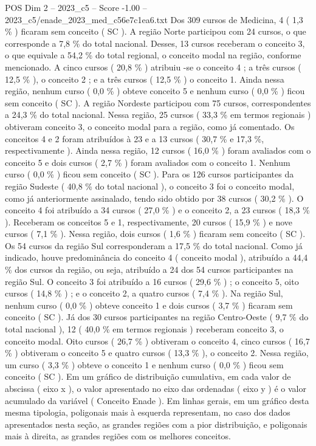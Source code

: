 \begin{textsample}{POS Dim 2 – 2023\_c5 – Score -1.00 – 2023\_c5/enade\_2023\_med\_c56e7c1ea6.txt}
Dos 309 cursos de Medicina, 4 ( 1,3 \% ) ficaram sem conceito ( SC ).
A região Norte participou com 24 cursos, o que corresponde a 7,8 \% do total nacional.
Desses, 13 cursos receberam o conceito 3, o que equivale a 54,2 \% do total regional, o conceito modal na região, conforme mencionado.
A cinco cursos ( 20,8 \% ) atribuiu -se o conceito 4 ; a três cursos ( 12,5 \% ), o conceito 2 ; e a três cursos ( 12,5 \% ) o conceito 1.
Ainda nessa região, nenhum curso ( 0,0 \% ) obteve conceito 5 e nenhum curso ( 0,0 \% ) ficou sem conceito ( SC ).
A região Nordeste participou com 75 cursos, correspondentes a 24,3 \% do total nacional.
Nessa região, 25 cursos ( 33,3 \% em termos regionais ) obtiveram conceito 3, o conceito modal para a região, como já comentado.
Os conceitos 4 e 2 foram atribuídos à 23 e a 13 cursos ( 30,7 \% e 17,3 \%, respectivamente ).
Ainda nessa região, 12 cursos ( 16,0 \% ) foram avaliados com o conceito 5 e dois cursos ( 2,7 \% ) foram avaliados com o conceito 1.
Nenhum curso ( 0,0 \% ) ficou sem conceito ( SC ).
Para os 126 cursos participantes da região Sudeste ( 40,8 \% do total nacional ), o conceito 3 foi o conceito modal, como já anteriormente assinalado, tendo sido obtido por 38 cursos ( 30,2 \% ).
O conceito 4 foi atribuído a 34 cursos ( 27,0 \% ) e o conceito 2, a 23 cursos ( 18,3 \% ).
Receberam os conceitos 5 e 1, respectivamente, 20 cursos ( 15,9 \% ) e nove cursos ( 7,1 \% ).
Nessa região, dois cursos ( 1,6 \% ) ficaram sem conceito ( SC ).
Os 54 cursos da região Sul corresponderam a 17,5 \% do total nacional.
Como já indicado, houve predominância do conceito 4 ( conceito modal ), atribuído a 44,4 \% dos cursos da região, ou seja, atribuído a 24 dos 54 cursos participantes na região Sul.
O conceito 3 foi atribuído a 16 cursos ( 29,6 \% ) ; o conceito 5, oito cursos ( 14,8 \% ) ; e o conceito 2, a quatro cursos ( 7,4 \% ).
Na região Sul, nenhum curso ( 0,0 \% ) obteve conceito 1 e dois cursos ( 3,7 \% ) ficaram sem conceito ( SC ).
Já dos 30 cursos participantes na região Centro-Oeste ( 9,7 \% do total nacional ), 12 ( 40,0 \% em termos regionais ) receberam conceito 3, o conceito modal.
Oito cursos ( 26,7 \% ) obtiveram o conceito 4, cinco cursos ( 16,7 \% ) obtiveram o conceito 5 e quatro cursos ( 13,3 \% ), o conceito 2.
Nessa região, um curso ( 3,3 \% ) obteve o conceito 1 e nenhum curso ( 0,0 \% ) ficou sem conceito ( SC ).
Em um gráfico de distribuição cumulativa, em cada valor de abscissa ( eixo x ), o valor apresentado no eixo das ordenadas ( eixo y ) é o valor acumulado da variável ( Conceito Enade ).
Em linhas gerais, em um gráfico desta mesma tipologia, poligonais mais à esquerda representam, no caso dos dados apresentados nesta seção, as grandes regiões com a pior distribuição, e poligonais mais à direita, as grandes regiões com os melhores conceitos.

\end{textsample}
